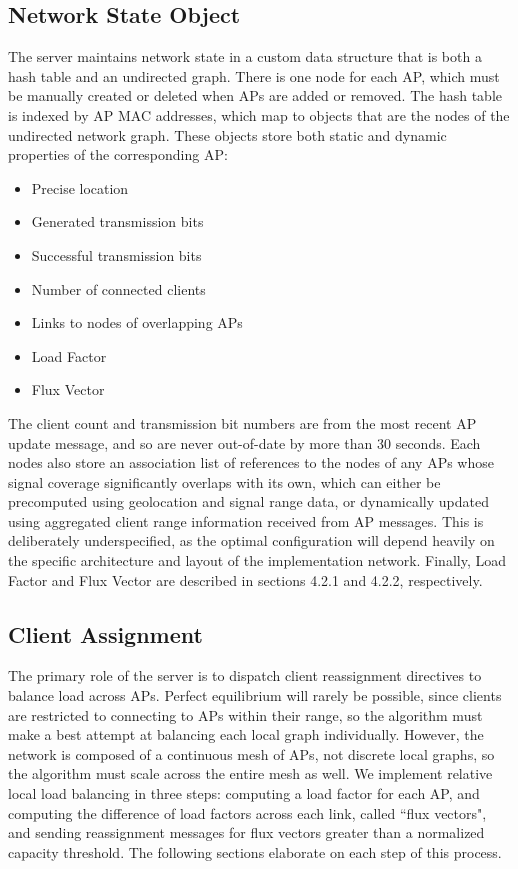 \documentclass[10pt,journal,compsoc]{IEEEtran}
\begin{document}
		\subsection{Network State Object}
		The server maintains network state in a custom data structure that is both a hash table and an undirected graph. There is one node for each AP, which must be manually created or deleted when APs are added or removed. The hash table is indexed by AP MAC addresses, which map to objects that are the nodes of the undirected network graph. These objects store both static and dynamic properties of the corresponding AP:
		\begin{itemize}
			\item Precise location
			\item Generated transmission bits
			\item Successful transmission bits
			\item Number of connected clients
			\item Links to nodes of overlapping APs
			\item Load Factor
			\item Flux Vector
		\end{itemize}
		The client count and transmission bit numbers are from the most recent AP update message, and so are never out-of-date by more than 30 seconds. Each nodes also store an association list of references to the nodes of any APs whose signal coverage significantly overlaps with its own, which can either be precomputed using geolocation and signal range data, or dynamically updated using aggregated client range information received from AP messages. This is deliberately underspecified, as the optimal configuration will depend heavily on the specific architecture and layout of the implementation network. Finally, Load Factor and Flux Vector are described in sections 4.2.1 and 4.2.2, respectively.
		
		\subsection{Client Assignment}
		The primary role of the server is to dispatch client reassignment directives to balance load across APs. Perfect equilibrium will rarely be possible, since clients are restricted to connecting to APs within their range, so the algorithm must make a best attempt at balancing each local graph individually. However, the network is composed of a continuous mesh of APs, not discrete local graphs, so the algorithm must scale across the entire mesh as well. We implement relative local load balancing in three steps: computing a load factor for each AP, and computing the difference of load factors across each link, called ``flux vectors", and sending reassignment messages for flux vectors greater than a normalized capacity threshold. The following sections elaborate on each step of this process.
		
\end{document}
